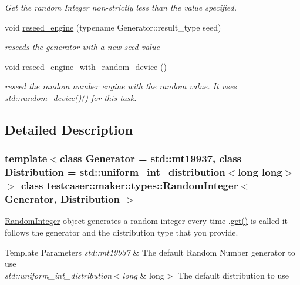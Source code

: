 \begin{DoxyCompactItemize}
\begin{DoxyCompactList}\small\item\em Get the random Integer non-\/strictly less than the value specified. \end{DoxyCompactList}\item 
void \mbox{\hyperlink{classtestcaser_1_1maker_1_1types_1_1RandomInteger_a86d3dace9ceb412e5337da90818da7b6}{reseed\+\_\+engine}} (typename Generator\+::result\+\_\+type seed)
\begin{DoxyCompactList}\small\item\em reseeds the generator with a new seed value \end{DoxyCompactList}\item 
void \mbox{\hyperlink{classtestcaser_1_1maker_1_1types_1_1RandomInteger_acf2d349fda6b89bad9f0de71947a637e}{reseed\+\_\+engine\+\_\+with\+\_\+random\+\_\+device}} ()
\begin{DoxyCompactList}\small\item\em reseed the random number engine with the random value. It uses std\+::random\+\_\+device()() for this task. \end{DoxyCompactList}\end{DoxyCompactItemize}


\subsection{Detailed Description}
\subsubsection*{template$<$class Generator = std\+::mt19937, class Distribution = std\+::uniform\+\_\+int\+\_\+distribution$<$long long$>$$>$\newline
class testcaser\+::maker\+::types\+::\+Random\+Integer$<$ Generator, Distribution $>$}

\mbox{\hyperlink{classtestcaser_1_1maker_1_1types_1_1RandomInteger}{Random\+Integer}} object generates a random integer every time .\mbox{\hyperlink{classtestcaser_1_1maker_1_1types_1_1RandomInteger_a3b7754ca1c579f58b959ca6adb483a51}{get()}} is called it follows the generator and the distribution type that you provide. 


\begin{DoxyTemplParams}{Template Parameters}
{\em std\+::mt19937} & The default Random Number generator to use \\
\hline
{\em std\+::uniform\+\_\+int\+\_\+distribution$<$long} & long$>$ The default distribution to use \\
\hline
\end{DoxyTemplParams}


